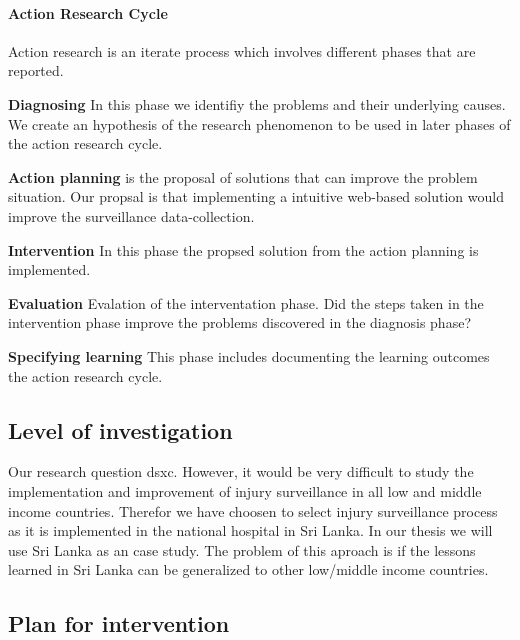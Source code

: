 \documentclass[UKenglish, 12pt]{article}
\begin{document}
\paragraph{Action Research Cycle}
Action research is an iterate process which involves different phases that are reported.
\begin{description}
\item\textbf{{Diagnosing}} In this phase we identifiy the problems and their underlying causes. We create an hypothesis of the research phenomenon to be used in later phases of the action research cycle. 
\item{\textbf{Action planning}} is the proposal of solutions that can improve the problem situation. Our propsal is that implementing a intuitive web-based solution would improve the surveillance data-collection.
\item{\textbf{Intervention}} In this phase the propsed solution from the action planning is implemented.
\item{\textbf{Evaluation}} Evalation of the interventation phase. Did the steps taken in the intervention phase improve the problems discovered in the diagnosis phase?
\item{\textbf{Specifying learning}} This phase includes documenting the learning outcomes the action research cycle. 

\end{description}

\subsection{Level of investigation}
Our research question dsxc. However, it would be very difficult to study the implementation and improvement of injury surveillance in all low and middle income countries. Therefor we have choosen to select injury surveillance process as it is implemented in the national hospital in Sri Lanka. In our thesis we will use Sri Lanka as an case study. The problem of this aproach is if the lessons learned in Sri Lanka can be generalized to other low/middle income countries.

\subsection{Plan for intervention}

\pagebreak
\printbibliography
\end{document}
